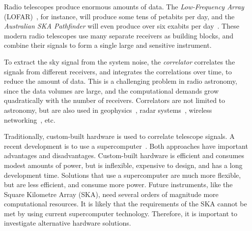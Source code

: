 \documentclass{article}
\begin{document}
Radio telescopes produce enormous amounts of data.
The \emph{Low-Frequency Array\/} (LOFAR)~\cite{deVos:09}, for instance, will produce some tens
of petabits per day, and the \emph{Australian SKA Pathfinder\/} will
even produce over six exabits per day~\cite{askap}.
These modern radio telescopes use many separate receivers as building blocks,
and combine their signals to form a single large and sensitive instrument.

To extract the sky signal from the system noise, the \emph{correlator\/}
correlates the signals from different receivers, and integrates the
correlations over time, to reduce the amount of data.
This is a challenging problem in radio astronomy,
since the data volumes are large, and the computational demands grow
quadratically with the number of receivers.
Correlators are not limited to astronomy, but are also used 
in geophysics~\cite{correlator-geophysics},
radar systems~\cite{correlator-radar}, 
wireless networking~\cite{correlator-wireless}, etc.

Traditionally, custom-built hardware is used to correlate telescope signals.
A recent development is to use a supercomputer~\cite{Romein:06}.
Both approaches have important advantages and disadvantages.
Custom-built hardware is efficient and consumes modest amounts of power, but is
inflexible, expensive to design, and has a long development time.
Solutions that use a supercomputer are much more flexible, but are less
efficient, and consume more power. %
Future instruments, like the Square Kilometre Array (SKA), need several orders
of magnitude more computational resources.
It is likely that the requirements of the SKA cannot be met by using
current supercomputer technology. Therefore, it is important to investigate
alternative hardware solutions.
\end{document}

